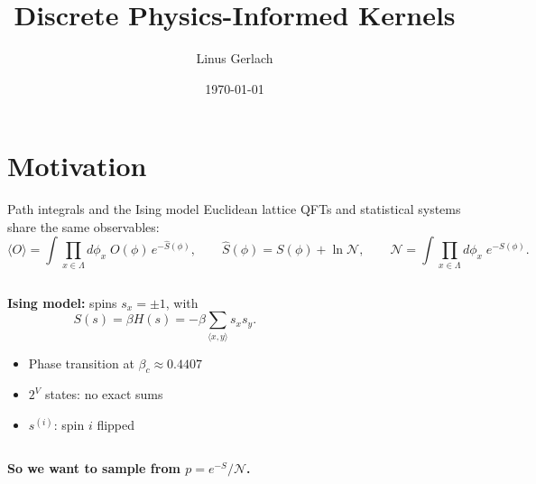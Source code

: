 \documentclass[aspectratio=169]{beamer}
\title[Discrete PIK]{Discrete Physics-Informed Kernels}
\author{Linus Gerlach}
\institute[ITP Heidelberg]{ITP Heidelberg}
\date{\today}
\def\b{\begin{equation}}
\def\e{\end{equation}}
\newcommand{\isinglattice}[3]{%
  \begin{scope}[xshift=#1cm]
    \foreach \p in {0,...,3} {
      \draw[gray!60] (-0.35,\p*0.7) -- (2.45,\p*0.7);
      \draw[gray!60] (\p*0.7,-0.35) -- (\p*0.7,2.45);
    }
    \foreach \sp [count=\k from 0] in {#2} {
      \pgfmathtruncatemacro{\col}{mod(\k,4)}
      \pgfmathtruncatemacro{\row}{3-int(\k/4)}
      \ifnum\k=#3
        \fill[orange!45] (\col*0.7,\row*0.7) circle (0.31);
      \fi
      \ifnum\sp>0
        \draw[-latex,very thick,blue!75!black]
          (\col*0.7,\row*0.7-0.22) -- (\col*0.7,\row*0.7+0.22);
      \else
        \draw[-latex,very thick,red!75!black]
          (\col*0.7,\row*0.7+0.22) -- (\col*0.7,\row*0.7-0.22);
      \fi
    }
  \end{scope}%
}
\begin{document}
\begin{frame}
  \titlepage
\end{frame}

\section{Motivation}

\begin{frame}{Path integrals and the Ising model}
  Euclidean lattice QFTs and statistical systems share the same observables:
  \b
    \langle O \rangle = \int \prod_{x\in\Lambda} d\phi_x\; O(\phi)\, e^{-\hat{S}(\phi)},
    \qquad \hat{S}(\phi) = S(\phi) + \ln\mathcal N,
    \qquad \mathcal N = \int \prod_{x\in\Lambda} d\phi_x\; e^{-S(\phi)} .
  \e
  \begin{columns}[c]
    \begin{column}{0.46\textwidth}
      \textbf{Ising model:} spins $s_x=\pm1$, with
      \b
        S(s) = \beta H(s) = -\beta\sum_{\langle x,y\rangle} s_x s_y .
      \e
      \begin{itemize}
        \item Phase transition at $\beta_c\approx 0.4407$
        \item $2^V$ states: no exact sums
        \item $s^{(i)}$: spin $i$ flipped
      \end{itemize}
    \end{column}
    \begin{column}{0.52\textwidth}
      \centering
    \end{column}
  \end{columns}
  \vspace{0.4em}
  \begin{center}
    \textbf{So we want to sample from $p=e^{-S}/\mathcal N$.}
  \end{center}
\end{frame}
\end{document}

